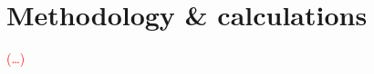 \section{Methodology \& calculations} %
\label{sec:methodology-calculations}
\textcolor{red}{(\ldots)}


